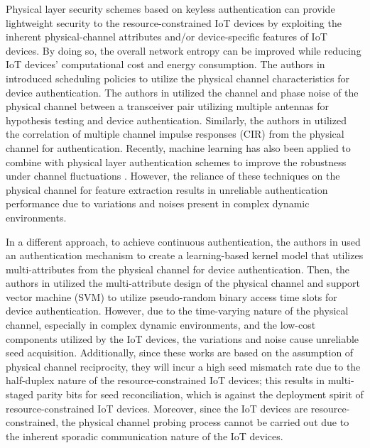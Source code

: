 \documentclass[journal,10pt]{IEEEtran}
\begin{document}
Physical layer security schemes based on keyless authentication \cite{hou2014physical, zhang2020physical, xie2021physical} can provide lightweight security to the resource-constrained IoT devices by exploiting the inherent physical-channel attributes and/or device-specific features of IoT devices. By doing so, the overall network entropy can be improved while reducing IoT devices' computational cost and energy consumption. The authors in \cite{hou2014physical} introduced scheduling policies to utilize the physical channel characteristics for device authentication. The authors in \cite{zhang2020physical} utilized the channel and phase noise of the physical channel between a transceiver pair utilizing multiple antennas for hypothesis testing and device authentication. Similarly, the authors in \cite{xie2021physical} utilized the correlation of multiple channel impulse responses (CIR) from the physical channel for authentication. Recently, machine learning has also been applied to combine with physical layer authentication schemes to improve the robustness under channel fluctuations \cite{10012482, 9851464, 9446939}. However, the reliance of these techniques on the physical channel for feature extraction results in unreliable authentication performance due to variations and noises present in complex dynamic environments.   

In a different approach, to achieve continuous authentication, the authors in \cite{fang2019learning} used an authentication mechanism to create a learning-based kernel model that utilizes multi-attributes from the physical channel for device authentication. Then, the authors in \cite{9378574} utilized the multi-attribute design of the physical channel and support vector machine (SVM) to utilize pseudo-random binary access time slots for device authentication. However, due to the time-varying nature of the physical channel, especially in complex dynamic environments, and the low-cost components utilized by the IoT devices, the variations and noise cause unreliable seed acquisition. Additionally, since these works are based on the assumption of physical channel reciprocity, they will incur a high seed mismatch rate due to the half-duplex nature of the resource-constrained IoT devices; this results in multi-staged parity bits for seed reconciliation, which is against the deployment spirit of resource-constrained IoT devices. Moreover, since the IoT devices are resource-constrained, the physical channel probing process cannot be carried out due to the inherent sporadic communication nature of the IoT devices. 
\end{document}
